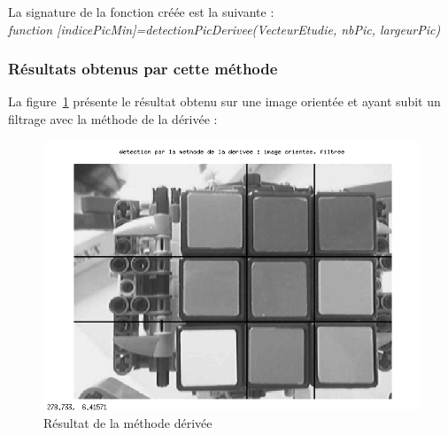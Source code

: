   La signature de la fonction créée est la suivante : \\
\textit{function [indicePicMin]=detectionPicDerivee(VecteurEtudie, nbPic, largeurPic)}

\subsubsection*{Résultats obtenus par cette méthode}

     La figure~\ref{derivee_resultat_1} présente le résultat obtenu sur une image orientée et ayant subit un filtrage avec la méthode de la dérivée : 
 
 \begin{figure}[!h]
 \centering
 \includegraphics[width=0.9\linewidth]{Images/Derivee_img_traitement_3.png} 
 \caption{Résultat de la méthode dérivée} 
 \label{derivee_resultat_1}
 \end{figure}
